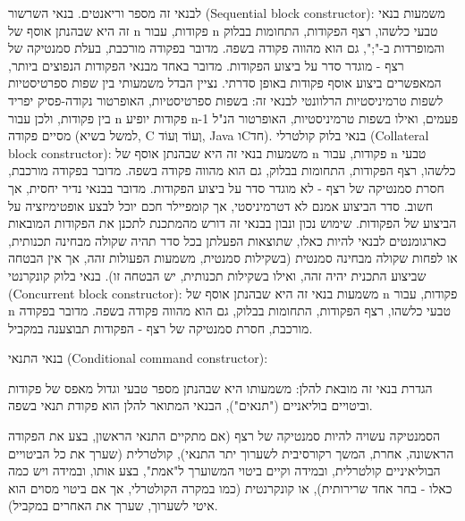         לבנאי זה מספר וריאנטים.
        בנאי השרשור (Sequential block constructor):
        משמעות בנאי זה היא שבהנתן אוסף של n פקודות, עבור n טבעי כלשהו, רצף הפקודות, התחומות בבלוק והמופרדות ב-";", גם הוא מהווה פקודה בשפה. מדובר בפקודה מורכבת, בעלת סמנטיקה של רצף - מוגדר סדר על ביצוע הפקודות.
        מדובר באחד מבנאי הפקודות הנפוצים ביותר, המאפשרים ביצוע אוסף פקודות באופן סדרתי. נציין הבדל משמעותי בין שפות ספרטיסטיות לשפות טרמיניסטיות הרלוונטי לבנאי זה: בשפות ספרטיסטיות, האופרטור נקודה-פסיק יפריד בין פקודות, ולכן עבור n פקודות יופיע n-1 פעמים, ואילו בשפות טרמיניסטיות, האופרטור הנ"ל מסיים פקודה (למשל בשיא, C וְעוֹד וְעוֹד, Java וCחד).
        בנאי בלוק קולטרלי (Collateral block constructor):
        משמעות בנאי זה היא שבהנתן אוסף של n פקודות, עבור n טבעי כלשהו, רצף הפקודות,
        התחומות בבלוק, גם הוא מהווה פקודה בשפה. מדובר בפקודה מורכבת, חסרת סמנטיקה של
        רצף - לא מוגדר סדר על ביצוע הפקודות. מדובר בבנאי נדיר יחסית, אך חשוב. סדר
        הביצוע אמנם לא דטרמיניסטי, אך קומפיילר חכם
        יוכל לבצע אופטימיזציה על הביצוע של הפקודות. שימוש נכון ונבון בבנאי זה דורש
        מהמתכנת לתכנן את הפקודות המובאות כארגומנטים לבנאי להיות כאלו, שתוצאות הפעלתן
        בכל סדר תהיה שקולה מבחינה תכנותית, או לפחות שקולה מבחינה סמנטית (בשקילות
        סמנטית, משמעות הפעולות זהה, אך אין הבטחה שביצוע התכנית יהיה זהה, ואילו בשקילות
        תכנותית, יש הבטחה זו). בנאי בלוק קונקרנטי (Concurrent block constructor):
        משמעות בנאי זה היא שבהנתן אוסף של n פקודות, עבור n טבעי כלשהו, רצף הפקודות, התחומות בבלוק, גם הוא מהווה פקודה בשפה. מדובר בפקודה מורכבת, חסרת סמנטיקה של רצף - הפקודות תבוצענה במקביל.

        בנאי התנאי (Conditional command constructor):

        הגדרת בנאי זה מובאת להלן:
        משמעותו היא שבהנתן מספר טבעי וגדול מאפס של פקודות וביטויים בוליאניים ("תנאים"), הבנאי המתואר להלן הוא פקודת תנאי בשפה.

        הסמנטיקה עשויה להיות סמנטיקה של רצף (אם מתקיים התנאי הראשון, בצע את הפקודה
        הראשונה, אחרת, המשך רקורסיבית לשערוך יתר התנאי), קולטרלית (שערך את כל הביטויים
        הבוליאיניים קולטרלית, ובמידה וקיים ביטוי המשוערך ל"אמת", בצע אותו, ובמידה ויש
        כמה כאלו - בחר אחד שרירותית), או קונקרנטית (כמו במקרה הקולטרלי, אך אם ביטוי
        מסוים הוא איטי לשערוך, שערך את האחרים במקביל).

